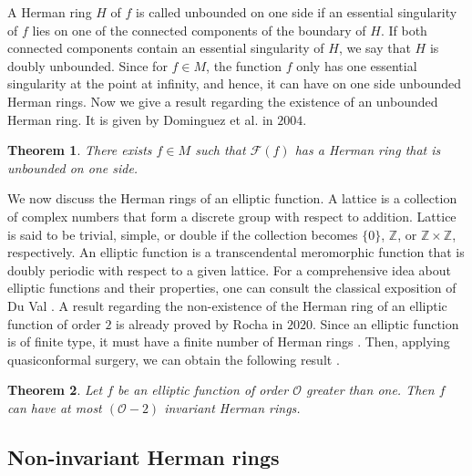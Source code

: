 \documentclass[12pt]{article}
\newtheorem{theorem}{Theorem}[section]
\begin{document}
A Herman ring $H$ of $f$ is called unbounded on one side if an essential singularity of $f$ lies on one of the connected components  of the boundary of $H$. If both connected components contain an essential singularity of $H$, we say that $H$ is doubly unbounded. Since for $f\in M$, the function $f$ only has one essential singularity at the point at infinity, and hence, it can have on one side unbounded Herman rings. Now we give a result regarding the existence of an unbounded Herman ring. It is given by Dominguez et al. \cite{pdnf} in $2004$.

\begin{theorem}\label{260}
	There exists $f\in M$ such that $\mathcal{F}(f)$ has a Herman ring that is unbounded on one side.
\end{theorem}

\par




We now discuss the Herman rings of an elliptic function. A lattice is a collection of complex numbers that form a discrete group with respect to addition. Lattice is said to be trivial, simple, or double if the collection becomes $\{0\}$, $\mathbb{Z}$, or $\mathbb{Z} \times \mathbb{Z}$, respectively. An elliptic function is a transcendental meromorphic function that is doubly periodic with respect to a given lattice. For a comprehensive idea about elliptic functions and their properties, one can consult the classical exposition of Du Val \cite{duval}. A result regarding the non-existence of the  Herman ring of an elliptic function of order $2$ is already proved by Rocha \cite{rocha} in $2020$. Since an elliptic function is of finite type, it must have a finite number of Herman rings \cite{zh}. Then, applying quasiconformal surgery, we can obtain the following result \cite{rocha}.
\begin{theorem}
	Let $f$ be an elliptic function of order $\mathcal{O}$ greater than one. Then $f$ can have at most $(\mathcal{O}-2)$ invariant Herman rings.
\end{theorem}

\subsection{Non-invariant Herman rings}

\end{document}
